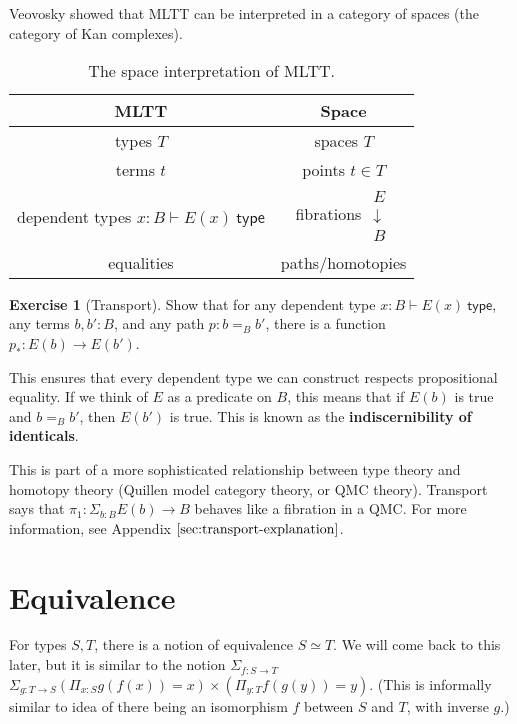 \documentclass{amsart}
\theoremstyle{definition}
\newtheorem{ex}{Exercise}[section]
\newcommand{\type}{\ensuremath{\mathsf{~type}}}
\renewcommand{\emph}{\textbf}
\begin{document}
%    

Veovosky showed that MLTT can be interpreted in a category of spaces (the category of Kan complexes).
\begin{table}[h]
    \centering
    \begin{tabular}{|c|c|}\hline
        MLTT & Space\\\hline
        types $T$ & spaces $T$\\\hline
        terms $t$ & points $t \in T$\\\hline
        dependent types $x : B \vdash E(x) \type$ & fibrations 
            $\begin{array}{c}
            E\\
            \downarrow\\
            B
            \end{array}$\\\hline
        equalities & paths/homotopies\\\hline
    \end{tabular}
    \caption{The space interpretation of MLTT.}
    \label{tab:the-space-interpretation-of-mltt}
\end{table}

\begin{ex}[Transport]
    Show that for any dependent type $x : B \vdash E(x) \type $, any terms $b, b' : B$, and any path $p : b =_B b'$, there is a function $p_{*} : E(b) \to E(b')$.
\end{ex}
This ensures that every dependent type we can construct respects propositional equality. 
If we think of $E$ as a predicate on $B$, this means that if $E(b)$ is true and $b =_B b'$, then $E(b')$ is true.
This is known as the \emph{indiscernibility of identicals}.

This is part of a more sophisticated relationship between type theory and homotopy theory (Quillen model category theory, or QMC theory). 
Transport says that $\pi_{1} : \Sigma_{b : B} E(b) \rightarrow B$ behaves like a fibration in a QMC. For more information, see Appendix $\ref{sec:transport-explanation}$.

\section{Equivalence}
For types $S, T$, there is a notion of equivalence $S \simeq T$. We will come back to this later, but it is similar to the notion $\Sigma_{f : S \rightarrow T}$ $\Sigma_{g : T \rightarrow S} (\Pi_{x : S} g(f (x)) = x) \times (\Pi_{y : T} f(g(y)) = y)$. (This is informally similar to idea of there being an isomorphism $f$ between $S$ and $T$, with inverse $g$.)
\end{document}
